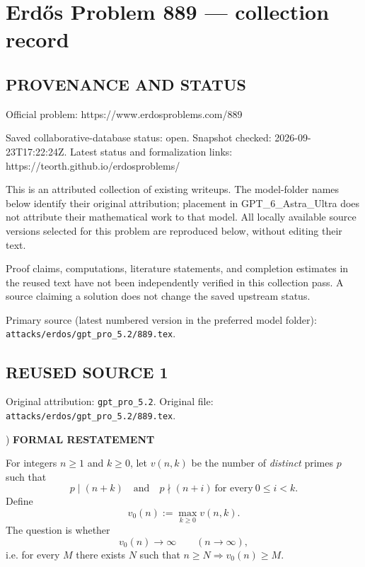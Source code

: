 \section*{Erd\H{o}s Problem 889 --- collection record}

\subsection*{PROVENANCE AND STATUS}
Official problem: https://www.erdosproblems.com/889

Saved collaborative-database status: open.
Snapshot checked: 2026-09-23T17:22:24Z.
Latest status and formalization links: https://teorth.github.io/erdosproblems/

This is an attributed collection of existing writeups. The model-folder names below identify their original attribution; placement in GPT\_6\_Astra\_Ultra does not attribute their mathematical work to that model. All locally available source versions selected for this problem are reproduced below, without editing their text.

Proof claims, computations, literature statements, and completion estimates in the reused text have not been independently verified in this collection pass. A source claiming a solution does not change the saved upstream status.

Primary source (latest numbered version in the preferred model folder): \texttt{attacks/erdos/gpt\_pro\_5.2/889.tex}.

\subsection*{REUSED SOURCE 1}
Original attribution: \texttt{gpt\_pro\_5.2}.
Original file: \texttt{attacks/erdos/gpt\_pro\_5.2/889.tex}.


) \textbf{FORMAL RESTATEMENT}

\noindent For integers $n\ge 1$ and $k\ge 0$, let $v(n,k)$ be the number of \emph{distinct} primes $p$ such that
\[
 p\mid (n+k)\quad\text{and}\quad p\nmid (n+i)\ \text{for every}\ 0\le i<k.
\]
Define
\[
 v_0(n) := \max_{k\ge 0} v(n,k).
\]
The question is whether
\[
 v_0(n) \longrightarrow \infty \qquad (n\to\infty),
\]
i.e. for every $M$ there exists $N$ such that $n\ge N\Rightarrow v_0(n)\ge M$.

